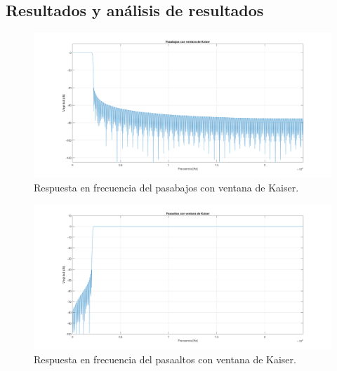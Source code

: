 \subsection{Resultados y análisis de resultados}
\begin{figure}[H]
  \includegraphics[scale=.35]{./images/3/pasabajoskaisermodulo.png}
  \caption{Respuesta en frecuencia del pasabajos con ventana de Kaiser.}
\end{figure}
\begin{figure}[H]
  \includegraphics[scale=.35]{./images/3/pasaaltoskaisermodulo.png}
  \caption{Respuesta en frecuencia del pasaaltos con ventana de Kaiser.}
\end{figure}
